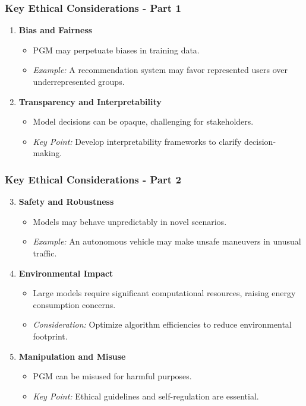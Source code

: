 \documentclass[aspectratio=169]{beamer}
\begin{document}
\begin{frame}[fragile]
    \frametitle{Key Ethical Considerations - Part 1}
    \begin{enumerate}
        \item \textbf{Bias and Fairness}
        \begin{itemize}
            \item PGM may perpetuate biases in training data.
            \item \textit{Example:} A recommendation system may favor represented users over underrepresented groups.
        \end{itemize}
        
        \item \textbf{Transparency and Interpretability}
        \begin{itemize}
            \item Model decisions can be opaque, challenging for stakeholders.
            \item \textit{Key Point:} Develop interpretability frameworks to clarify decision-making.
        \end{itemize}
    \end{enumerate}
\end{frame}

\begin{frame}[fragile]
    \frametitle{Key Ethical Considerations - Part 2}
    \begin{enumerate}
        \setcounter{enumi}{2}
        \item \textbf{Safety and Robustness}
        \begin{itemize}
            \item Models may behave unpredictably in novel scenarios.
            \item \textit{Example:} An autonomous vehicle may make unsafe maneuvers in unusual traffic.
        \end{itemize}
        
        \item \textbf{Environmental Impact}
        \begin{itemize}
            \item Large models require significant computational resources, raising energy consumption concerns.
            \item \textit{Consideration:} Optimize algorithm efficiencies to reduce environmental footprint.
        \end{itemize}
        
        \item \textbf{Manipulation and Misuse}
        \begin{itemize}
            \item PGM can be misused for harmful purposes.
            \item \textit{Key Point:} Ethical guidelines and self-regulation are essential.
        \end{itemize}
    \end{enumerate}
\end{frame}
\end{document}

